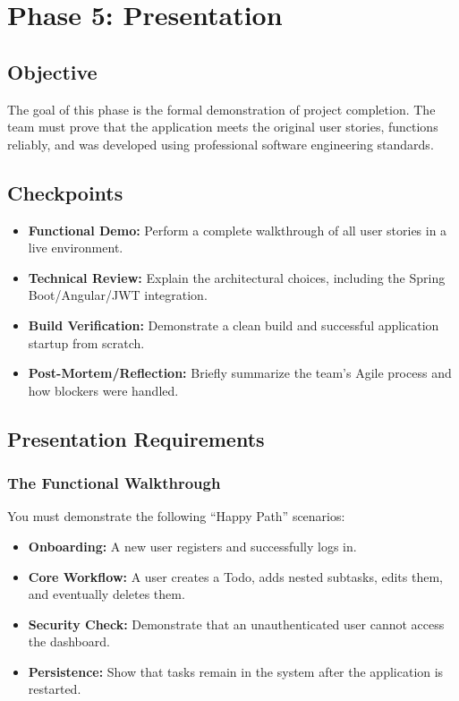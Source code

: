 

\section{Phase 5: Presentation}\label{sec:phase5}

\subsection{Objective}
The goal of this phase is the formal demonstration of project completion. The team must prove that
the application meets the original user stories, functions reliably, and was developed using
professional software engineering standards.

\subsection{Checkpoints}
\begin{itemize}
  \item[$\square$] \textbf{Functional Demo:} Perform a complete walkthrough of all user stories in a live environment.
  \item[$\square$] \textbf{Technical Review:} Explain the architectural choices, including the Spring Boot/Angular/JWT integration.
  \item[$\square$] \textbf{Build Verification:} Demonstrate a clean build and successful application startup from scratch.
  \item[$\square$] \textbf{Post-Mortem/Reflection:} Briefly summarize the team's Agile process and how blockers were handled.
\end{itemize}

\subsection{Presentation Requirements}

\subsubsection{The Functional Walkthrough}
You must demonstrate the following ``Happy Path'' scenarios:
\begin{itemize}
  \item \textbf{Onboarding:} A new user registers and successfully logs in.
  \item \textbf{Core Workflow:} A user creates a Todo, adds nested subtasks, edits them, and eventually deletes them.
  \item \textbf{Security Check:} Demonstrate that an unauthenticated user cannot access the dashboard.
  \item \textbf{Persistence:} Show that tasks remain in the system after the application is restarted.
\end{itemize}


